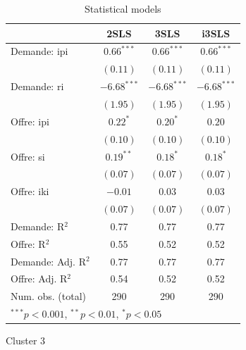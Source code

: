 \documentclass[11pt,]{article}
\begin{document}
\begin{table}[!htbp]
\begin{center}
\begin{tabular}{l c c c }
\hline
 & 2SLS & 3SLS & i3SLS \\
\hline
Demande: ipi        & $0.66^{***}$  & $0.66^{***}$  & $0.66^{***}$  \\
                    & $(0.11)$      & $(0.11)$      & $(0.11)$      \\
Demande: ri         & $-6.68^{***}$ & $-6.68^{***}$ & $-6.68^{***}$ \\
                    & $(1.95)$      & $(1.95)$      & $(1.95)$      \\
Offre: ipi          & $0.22^{*}$    & $0.20^{*}$    & $0.20$        \\
                    & $(0.10)$      & $(0.10)$      & $(0.10)$      \\
Offre: si           & $0.19^{**}$   & $0.18^{*}$    & $0.18^{*}$    \\
                    & $(0.07)$      & $(0.07)$      & $(0.07)$      \\
Offre: iki          & $-0.01$       & $0.03$        & $0.03$        \\
                    & $(0.07)$      & $(0.07)$      & $(0.07)$      \\
\hline
Demande: R$^2$      & 0.77          & 0.77          & 0.77          \\
Offre: R$^2$        & 0.55          & 0.52          & 0.52          \\
Demande: Adj. R$^2$ & 0.77          & 0.77          & 0.77          \\
Offre: Adj. R$^2$   & 0.54          & 0.52          & 0.52          \\
Num. obs. (total)   & 290           & 290           & 290           \\
\hline
\multicolumn{4}{l}{\scriptsize{$^{***}p<0.001$, $^{**}p<0.01$, $^*p<0.05$}}
\end{tabular}
\caption{Statistical models}
\label{table : 2sls, 3sls and fiml cluster 2}
\end{center}
\end{table}

\FloatBarrier

Cluster 3

\FloatBarrier
\end{document}
